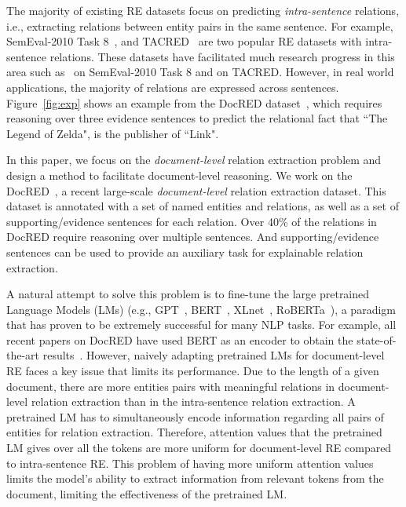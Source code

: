 \documentclass[11pt,a4paper]{article}
\begin{document}
The majority of existing RE datasets focus on predicting \textit{intra-sentence} relations, i.e., extracting relations between entity pairs in the same sentence. For example, SemEval-2010 Task 8~\cite{hendrickx-etal-2010-semeval}, and TACRED~\cite{zhang2017tacred} are two popular RE datasets with intra-sentence relations.
These datasets have facilitated much research progress in this area such as~\cite{wang-etal-2016-relation,Alt2019,pmlr-v101-zhao19a} on SemEval-2010 Task 8 and \cite{zhang2017tacred,guo-etal-2019-attention,baldini-soares-etal-2019-matching,spanBERT2019} on TACRED. 
However, in real world applications, the majority of relations are expressed across sentences.
Figure~\ref{fig:exp} shows an example from the DocRED dataset~\citep{yao-etal-2019-docred}, which requires reasoning over three evidence sentences to predict the relational fact that ``The Legend of Zelda", is the publisher of ``Link". 

In this paper, we focus on the \textit{document-level} relation extraction problem and design a method to facilitate document-level reasoning.
We work on the DocRED~\cite{yao-etal-2019-docred}, a recent large-scale \textit{document-level} relation extraction dataset.
This dataset is annotated with a set of named entities and relations, as well as a set of supporting/evidence sentences for each relation. 
Over 40\% of the relations in DocRED require reasoning over multiple sentences. And supporting/evidence sentences can be used to provide an auxiliary task for explainable relation extraction. 


A natural attempt to solve this problem is to fine-tune the large pretrained Language Models (LMs) (e.g., GPT~\cite{radford2019GPT}, BERT~\cite{devlin-bert}, XLnet~\cite{xlnet}, RoBERTa~\cite{anonymous2020roberta}), a paradigm that has proven to be extremely successful for many NLP tasks. 
For example, all recent papers on DocRED have used BERT as an encoder to obtain the state-of-the-art results~\cite{tang2020hin,acl2020latentreasoning}. 
However, naively adapting pretrained LMs for document-level RE faces a key issue that limits its performance. Due to the length of a given document, there are more entities pairs with meaningful relations in document-level relation extraction than in the intra-sentence relation extraction.
A pretrained LM has to simultaneously encode information regarding all pairs of entities for relation extraction.
Therefore, attention values that the pretrained LM gives over all the tokens are more uniform for document-level RE compared to intra-sentence RE. 
This problem of having more uniform attention values limits the model's ability to extract information from relevant tokens from the document, limiting the effectiveness of the pretrained LM. 
\end{document}
